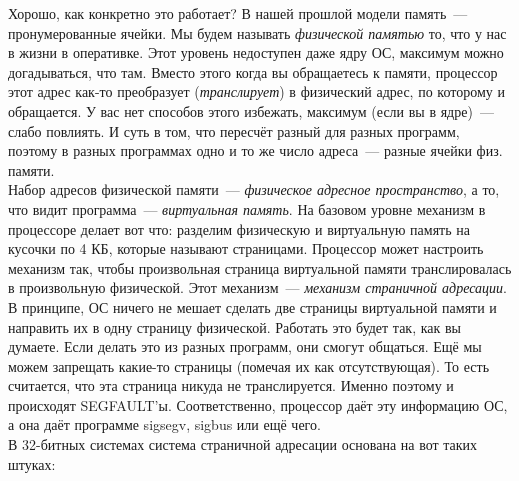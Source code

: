 \documentclass{article}
\begin{document}
    Хорошо, как конкретно это работает? В нашей прошлой модели память~--- пронумерованные ячейки. Мы будем называть \textit{физической памятью} то, что у нас в жизни в оперативке. Этот уровень недоступен даже ядру ОС, максимум можно догадываться, что там. Вместо этого когда вы обращаетесь к памяти, процессор этот адрес как-то преобразует (\textit{транслирует}) в физический адрес, по которому и обращается. У вас нет способов этого избежать, максимум (если вы в ядре)~--- слабо повлиять. И суть в том, что пересчёт разный для разных программ, поэтому в разных программах одно и то же число адреса~--- разные ячейки физ. памяти.\\
    Набор адресов физической памяти~--- \textit{физическое адресное пространство}, а то, что видит программа~--- \textit{виртуальная память}. На базовом уровне механизм в процессоре делает вот что: разделим физическую и виртуальную память на кусочки по 4 КБ, которые называют страницами. Процессор может настроить механизм так, чтобы произвольная страница виртуальной памяти транслировалась в произвольную физической. Этот механизм~--- \textit{механизм страничной адресации}. В принципе, ОС ничего не мешает сделать две страницы виртуальной памяти и направить их в одну страницу физической. Работать это будет так, как вы думаете. Если делать это из разных программ, они смогут общаться. Ещё мы можем запрещать какие-то страницы (помечая их как отсутствующая). То есть считается, что эта страница никуда не транслируется. Именно поэтому и происходят SEGFAULT'ы. Соответственно, процессор даёт эту информацию ОС, а она даёт программе sigsegv, sigbus или ещё чего.\\
    В 32-битных системах система страничной адресации основана на вот таких штуках:
    \begin{center}
    \end{center}
\end{document}
